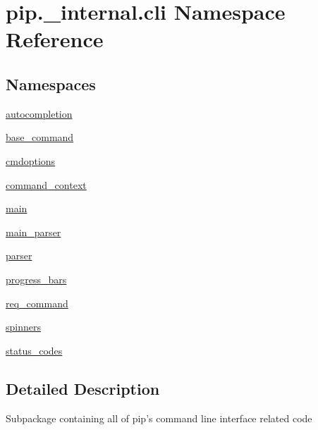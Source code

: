 \hypertarget{namespacepip_1_1__internal_1_1cli}{}\section{pip.\+\_\+internal.\+cli Namespace Reference}
\label{namespacepip_1_1__internal_1_1cli}
\subsection*{Namespaces}
\begin{DoxyCompactItemize}
\item 
 \hyperlink{namespacepip_1_1__internal_1_1cli_1_1autocompletion}{autocompletion}
\item 
 \hyperlink{namespacepip_1_1__internal_1_1cli_1_1base__command}{base\+\_\+command}
\item 
 \hyperlink{namespacepip_1_1__internal_1_1cli_1_1cmdoptions}{cmdoptions}
\item 
 \hyperlink{namespacepip_1_1__internal_1_1cli_1_1command__context}{command\+\_\+context}
\item 
 \hyperlink{namespacepip_1_1__internal_1_1cli_1_1main}{main}
\item 
 \hyperlink{namespacepip_1_1__internal_1_1cli_1_1main__parser}{main\+\_\+parser}
\item 
 \hyperlink{namespacepip_1_1__internal_1_1cli_1_1parser}{parser}
\item 
 \hyperlink{namespacepip_1_1__internal_1_1cli_1_1progress__bars}{progress\+\_\+bars}
\item 
 \hyperlink{namespacepip_1_1__internal_1_1cli_1_1req__command}{req\+\_\+command}
\item 
 \hyperlink{namespacepip_1_1__internal_1_1cli_1_1spinners}{spinners}
\item 
 \hyperlink{namespacepip_1_1__internal_1_1cli_1_1status__codes}{status\+\_\+codes}
\end{DoxyCompactItemize}


\subsection{Detailed Description}
\begin{DoxyVerb}Subpackage containing all of pip's command line interface related code
\end{DoxyVerb}
 